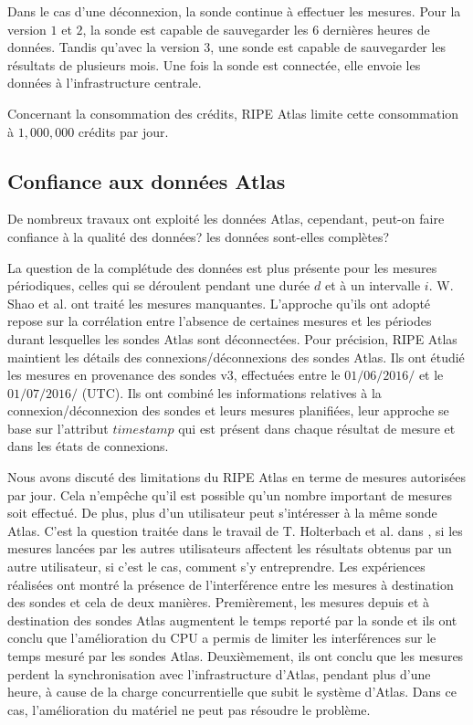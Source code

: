 Dans le cas d'une déconnexion, la sonde continue à effectuer les mesures. Pour la version $1$ et $2$, la sonde est capable de sauvegarder les  $6$ dernières heures de données. Tandis qu'avec  la  version $3$, une sonde est capable de sauvegarder les résultats de plusieurs mois. Une fois la sonde est connectée, elle envoie les  données à l'infrastructure centrale.

Concernant la consommation des crédits, RIPE Atlas limite cette consommation à  $1,000,000$ crédits par jour.


\subsection{Confiance aux données Atlas}

De nombreux travaux ont exploité les données Atlas, cependant, peut-on faire confiance à la qualité des données? les données sont-elles complètes?

La question de la complétude des données est plus présente pour les mesures périodiques, celles qui se déroulent pendant une durée $d$ et à un intervalle $i$. W. Shao et al.  \cite{DBLP:journals/corr/ShaoRDV17} ont traité les mesures manquantes.  L'approche qu'ils ont adopté repose sur la corrélation entre  l'absence de certaines mesures et les périodes durant lesquelles les sondes Atlas sont déconnectées. Pour précision, RIPE Atlas maintient les détails des connexions/déconnexions des sondes Atlas. Ils ont étudié les mesures en provenance des  sondes v$3$, effectuées entre le $01/06/2016/$ et  le $01/07/2016/$ (UTC). Ils ont combiné les informations relatives à la connexion/déconnexion des sondes et leurs mesures planifiées, leur approche se base sur l'attribut $timestamp$ qui est présent dans chaque résultat de mesure et dans les états de connexions.


Nous avons discuté des limitations du RIPE Atlas en terme de mesures autorisées par jour. Cela n'empêche qu'il est possible qu'un nombre important de mesures  soit effectué. De plus, plus d'un utilisateur peut s'intéresser à la même sonde Atlas. C'est la question traitée dans le travail de T. Holterbach et al. dans \cite{Holterbach:2015:QIM:2815675.2815710}, si les mesures lancées par les autres utilisateurs affectent les résultats obtenus par un autre utilisateur, si c'est le cas, comment s'y entreprendre. Les expériences réalisées ont montré la présence de l'interférence entre les mesures à destination des sondes et cela de deux manières. Premièrement, les mesures depuis et à destination des sondes Atlas augmentent le temps reporté par la sonde et ils ont conclu que l'amélioration du CPU a permis de limiter les interférences sur le temps mesuré par les sondes Atlas. Deuxièmement,  ils ont conclu que les mesures perdent la synchronisation avec l'infrastructure d'Atlas, pendant plus d'une heure, à cause de la charge concurrentielle que subit le système d'Atlas. Dans ce cas, l'amélioration du matériel ne peut pas résoudre le problème.

